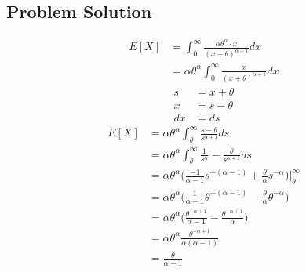 \documentclass[12pt]{article}
\theoremstyle{definition}
\begin{document}
\subsection*{Problem Solution}
\begin{align*}
E[X] &= \int_0^\infty \frac{\alpha \theta^\alpha \cdot x}{(x + \theta)^{\alpha + 1}}dx\\
&= \alpha \theta^\alpha \int_0^\infty \frac{x}{(x + \theta)^{\alpha + 1}}dx
\end{align*}
\begin{align*}
s &= x + \theta\\
x &= s - \theta\\
dx &= ds
\end{align*}
\begin{align*}
E[X] &= \alpha \theta^\alpha \int_\theta^\infty \frac{s - \theta}{s^{\alpha + 1}}ds\\
&= \alpha \theta^\alpha \int_\theta^\infty \frac{1}{s^\alpha} - \frac{\theta}{s^{\alpha + 1}}ds\\
&= \alpha \theta^\alpha \biggr(\frac{-1}{\alpha - 1}s^{-(\alpha - 1)} + \frac{\theta}{\alpha}s^{-\alpha} \biggr)\biggr|_\theta^\infty\\
&= \alpha \theta^\alpha \biggr(\frac{1}{\alpha - 1}\theta^{-(\alpha - 1)} - \frac{\theta}{\alpha}\theta^{-\alpha} \biggr)\\
&= \alpha \theta^\alpha \biggr(\frac{\theta^{-\alpha + 1} }{\alpha - 1}- \frac{\theta^{-\alpha + 1}}{\alpha} \biggr)\\
&= \alpha \theta^\alpha \frac{\theta^{-\alpha + 1}}{\alpha(\alpha - 1)}\\
&= \frac{\theta}{\alpha - 1}
\end{align*}
\end{document}
